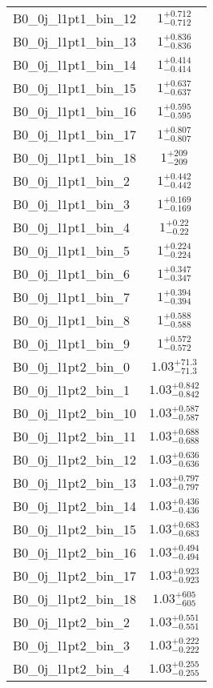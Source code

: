 \begin{tabular}{|l|c|}
B0\_0j\_l1pt1\_bin\_12 & $1^{+0.712}_{-0.712}$ \\
B0\_0j\_l1pt1\_bin\_13 & $1^{+0.836}_{-0.836}$ \\
B0\_0j\_l1pt1\_bin\_14 & $1^{+0.414}_{-0.414}$ \\
B0\_0j\_l1pt1\_bin\_15 & $1^{+0.637}_{-0.637}$ \\
B0\_0j\_l1pt1\_bin\_16 & $1^{+0.595}_{-0.595}$ \\
B0\_0j\_l1pt1\_bin\_17 & $1^{+0.807}_{-0.807}$ \\
B0\_0j\_l1pt1\_bin\_18 & $1^{+209}_{-209}$ \\
B0\_0j\_l1pt1\_bin\_2 & $1^{+0.442}_{-0.442}$ \\
B0\_0j\_l1pt1\_bin\_3 & $1^{+0.169}_{-0.169}$ \\
B0\_0j\_l1pt1\_bin\_4 & $1^{+0.22}_{-0.22}$ \\
B0\_0j\_l1pt1\_bin\_5 & $1^{+0.224}_{-0.224}$ \\
B0\_0j\_l1pt1\_bin\_6 & $1^{+0.347}_{-0.347}$ \\
B0\_0j\_l1pt1\_bin\_7 & $1^{+0.394}_{-0.394}$ \\
B0\_0j\_l1pt1\_bin\_8 & $1^{+0.588}_{-0.588}$ \\
B0\_0j\_l1pt1\_bin\_9 & $1^{+0.572}_{-0.572}$ \\
B0\_0j\_l1pt2\_bin\_0 & $1.03^{+71.3}_{-71.3}$ \\
B0\_0j\_l1pt2\_bin\_1 & $1.03^{+0.842}_{-0.842}$ \\
B0\_0j\_l1pt2\_bin\_10 & $1.03^{+0.587}_{-0.587}$ \\
B0\_0j\_l1pt2\_bin\_11 & $1.03^{+0.688}_{-0.688}$ \\
B0\_0j\_l1pt2\_bin\_12 & $1.03^{+0.636}_{-0.636}$ \\
B0\_0j\_l1pt2\_bin\_13 & $1.03^{+0.797}_{-0.797}$ \\
B0\_0j\_l1pt2\_bin\_14 & $1.03^{+0.436}_{-0.436}$ \\
B0\_0j\_l1pt2\_bin\_15 & $1.03^{+0.683}_{-0.683}$ \\
B0\_0j\_l1pt2\_bin\_16 & $1.03^{+0.494}_{-0.494}$ \\
B0\_0j\_l1pt2\_bin\_17 & $1.03^{+0.923}_{-0.923}$ \\
B0\_0j\_l1pt2\_bin\_18 & $1.03^{+605}_{-605}$ \\
B0\_0j\_l1pt2\_bin\_2 & $1.03^{+0.551}_{-0.551}$ \\
B0\_0j\_l1pt2\_bin\_3 & $1.03^{+0.222}_{-0.222}$ \\
B0\_0j\_l1pt2\_bin\_4 & $1.03^{+0.255}_{-0.255}$ \\

\end{tabular}
